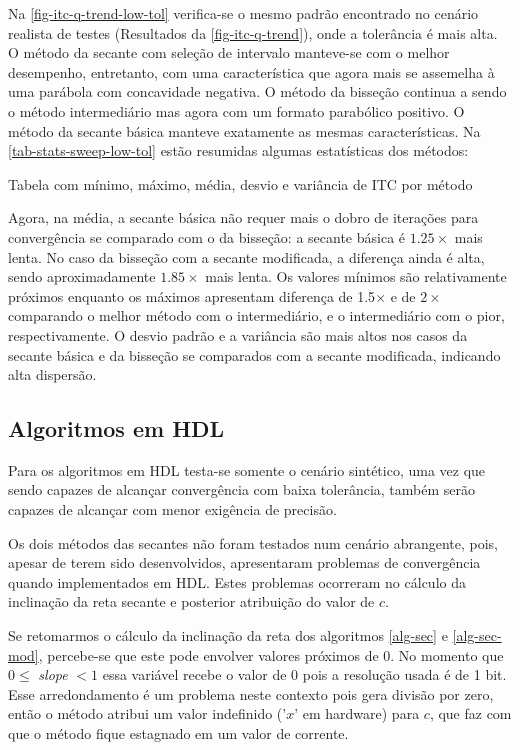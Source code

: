 Na \autoref{fig-itc-q-trend-low-tol} verifica-se o mesmo padrão encontrado no cenário realista de testes (Resultados da \autoref{fig-itc-q-trend}), onde a tolerância é mais alta. O método da secante com seleção de intervalo manteve-se com o melhor desempenho,  entretanto, com uma característica que agora mais se assemelha à uma parábola com concavidade negativa. O método da bisseção continua a sendo o método intermediário mas agora com um formato parabólico positivo. O método da secante básica manteve exatamente as mesmas características. Na \autoref{tab-stats-sweep-low-tol} estão resumidas algumas estatísticas dos métodos:

\begin{table}[H]
    \centering
    \caption{Tabela com mínimo, máximo, média, desvio e variância de ITC por método}
        
    \label{tab-stats-sweep-low-tol}
\end{table}

Agora, na média, a secante básica não requer mais o dobro de iterações para convergência se comparado com o da bisseção: a secante básica é $1.25\times$ mais lenta. No caso da bisseção com a secante modificada, a diferença ainda é alta, sendo aproximadamente $1.85\times$ mais lenta. Os valores mínimos são relativamente próximos enquanto os máximos apresentam diferença de 1.5$\times$ e de $2\times$ comparando o melhor método com o intermediário, e o intermediário com o pior, respectivamente. O desvio padrão e a variância são mais altos nos casos da secante básica e da bisseção se comparados com a secante modificada, indicando alta dispersão.


\subsection{Algoritmos em HDL}

Para os algoritmos em HDL testa-se somente o cenário sintético, uma vez que sendo capazes de alcançar convergência com baixa tolerância, também serão capazes de alcançar com menor exigência de precisão.

Os dois métodos das secantes não foram testados num cenário abrangente, pois, apesar de terem sido desenvolvidos, apresentaram problemas de convergência quando implementados em HDL. Estes problemas ocorreram no cálculo da inclinação da reta secante e posterior atribuição do valor de $c$. 

Se retomarmos o cálculo da inclinação da reta dos algoritmos \ref{alg-sec} e \ref{alg-sec-mod}, percebe-se que este pode envolver valores próximos de 0. No momento que $0 \leq $ \textit{slope} $ < 1$ essa variável recebe o valor de 0 pois a resolução usada é de 1 bit. Esse arredondamento é um problema neste contexto pois gera divisão por zero, então o método atribui um valor indefinido ('$x$' em hardware) para $c$, que faz com que o método fique estagnado em um valor de corrente.

